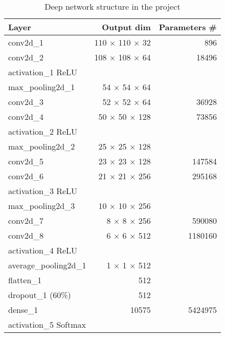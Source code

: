 \documentclass[conference]{IEEEtran}
\begin{document}
\setlength\extrarowheight{3pt}
\begin{table}[]
	\centering
	\caption{Deep network structure in the project}
	\label{mdl_stru}
	\begin{tabular}{|l|r|r|}
		\hline
		Layer                 & Output dim                   & Parameters \# \\ \hline
		conv2d\_1             & 110 $\times$ 110 $\times$ 32 & 896           \\ \hline
		conv2d\_2             & 108 $\times$ 108 $\times$ 64 & 18496         \\ \hline
		activation\_1 ReLU    &                              &               \\ \hline
		max\_pooling2d\_1     & 54 $\times$ 54 $\times$ 64   &               \\ \hline
		conv2d\_3             & 52 $\times$ 52 $\times$ 64   & 36928         \\ \hline
		conv2d\_4             & 50 $\times$ 50 $\times$ 128  & 73856         \\ \hline
		activation\_2 ReLU    &                              &               \\ \hline
		max\_pooling2d\_2     & 25 $\times$ 25 $\times$ 128  &               \\ \hline
		conv2d\_5             & 23 $\times$ 23 $\times$ 128  & 147584        \\ \hline
		conv2d\_6             & 21 $\times$ 21 $\times$ 256  & 295168        \\ \hline
		activation\_3 ReLU    &                              &               \\ \hline
		max\_pooling2d\_3     & 10 $\times$ 10 $\times$ 256  &               \\ \hline
		conv2d\_7             & 8 $\times$ 8 $\times$ 256    & 590080        \\ \hline
		conv2d\_8             & 6 $\times$ 6 $\times$ 512    & 1180160       \\ \hline
		activation\_4 ReLU    &                              &               \\ \hline
		average\_pooling2d\_1 & 1 $\times$ 1 $\times$ 512    &               \\ \hline
		flatten\_1            & 512                          &               \\ \hline
		dropout\_1 (60\%)     & 512                          &               \\ \hline
		dense\_1              & 10575                        & 5424975       \\ \hline
		activation\_5 Softmax &                              &               \\ \hline
	\end{tabular}
\end{table}
\end{document}
